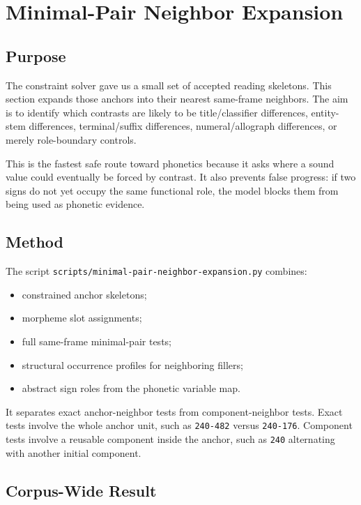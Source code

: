 \section{Minimal-Pair Neighbor Expansion}

\subsection{Purpose}

The constraint solver gave us a small set of accepted reading skeletons. This section expands those anchors into their nearest same-frame neighbors. The aim is to identify which contrasts are likely to be title/classifier differences, entity-stem differences, terminal/suffix differences, numeral/allograph differences, or merely role-boundary controls.

This is the fastest safe route toward phonetics because it asks where a sound value could eventually be forced by contrast. It also prevents false progress: if two signs do not yet occupy the same functional role, the model blocks them from being used as phonetic evidence.

\subsection{Method}

The script \texttt{scripts/minimal-pair-neighbor-expansion.py} combines:

\begin{itemize}
  \item constrained anchor skeletons;
  \item morpheme slot assignments;
  \item full same-frame minimal-pair tests;
  \item structural occurrence profiles for neighboring fillers;
  \item abstract sign roles from the phonetic variable map.
\end{itemize}

It separates exact anchor-neighbor tests from component-neighbor tests. Exact tests involve the whole anchor unit, such as \texttt{240-482} versus \texttt{240-176}. Component tests involve a reusable component inside the anchor, such as \texttt{240} alternating with another initial component.

\subsection{Corpus-Wide Result}

